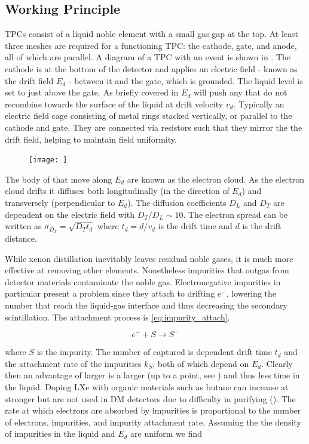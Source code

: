 \subsection{Working Principle}
\label{subsec:tpcs_working_principle}
TPCs consist of a liquid noble element with a small gas gap at the top.  At least three meshes are required for a functioning TPC: the
cathode, gate, and anode, all of which are parallel.  A diagram of a TPC with an event is shown in .  The cathode is
at the bottom of the detector and applies an electric field - known as the drift field $E_{d}$ - between
it and the gate, which is grounded.  The liquid level is set to just above the gate.  As briefly covered in 
$E_{d}$ will push any \electron that do not recombine towards the surface of the liquid at drift velocity $v_{d}$.  Typically an electric
field cage consisting
of metal rings stacked vertically, or parallel to the cathode and gate.  They are connected via resistors such that they mirror the
the drift field, helping to maintain field uniformity.

\begin{figure}
\texttt{[image: ]}
\label{fig:tpcs_tpc}
\end{figure}

The body of \electron that move along $E_{d}$ are known as the electron cloud.  As the electron cloud drifts it diffuses both
longitudinally (in the direction of $E_{d}$) and transversely (perpendicular to $E_{d}$).  The
diffusion coefficients $D_{L}$ and $D_{T}$ are dependent on the electric field with $D_{T}/D_{L} \sim 10$.  The electron spread can
be written as $\sigma_{D_{T}} = \sqrt{D_{T} t_{d}}$ where $t_{d} = d/v_{d}$ is the drift time and $d$ is the drift distance.

While xenon distillation inevitably leaves residual noble gases, it is much more effective at removing other elements.  Nonetheless
impurities that outgas from detector materials contaminate the noble gas.  Electronegative impurities in particular present a problem
since they attach to drifting $e^{-}$,
lowering the number that reach the liquid-gas interface and thus decreasing the secondary scintillation.  The attachment process
is \eqref{eq:impurity_attach}.

\begin{equation}
e^{-} + S \rightarrow S^{-}
\label{eq:impurity_attach}
\end{equation}

\noindent where $S$ is the impurity.  The number of \electron captured is dependent drift time $t_{d}$ and the
attachment rate of
the impurities $k_{S}$, both of which depend on $E_{d}$.  Clearly then an advantage of larger
\efields is a larger
\vd (up to a point, see ) and thus less time in the liquid.  Doping LXe with organic materials such as butane
can increase \vd at stronger
\efields but are not used in DM detectors due to difficulty in purifying ().  The rate at which electrons are
absorbed by impurities is proportional to the number of electrons, impurities, and impurity attachment rate.  Assuming the the density
of impurities in the liquid and $E_{d}$ are uniform we find

